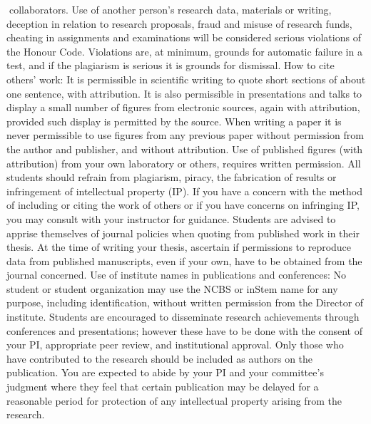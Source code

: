 \documentclass[a4paper,10pt]{article}
\begin{document}
collaborators. Use of another person’s research data, materials or writing, deception in
relation to research proposals, fraud and misuse of research funds, cheating in assignments
and examinations will be considered serious violations of the Honour Code. Violations are,
at minimum, grounds for automatic failure in a test, and if the plagiarism is serious it is
grounds for dismissal.
How to cite others’ work: It is permissible in scientific writing to quote short sections of
about one sentence, with attribution. It is also permissible in presentations and talks to
display a small number of figures from electronic sources, again with attribution, provided
such display is permitted by the source. When writing a paper it is never permissible to use
figures from any previous paper without permission from the author and publisher, and
without attribution. Use of published figures (with attribution) from your own laboratory or
others, requires written permission. All students should refrain from plagiarism, piracy, the
fabrication of results or infringement of intellectual property (IP). If you have a concern
with the method of including or citing the work of others or if you have concerns on
infringing IP, you may consult with your instructor for guidance. Students are advised to
apprise themselves of journal policies when quoting from published work in their thesis. At
the time of writing your thesis, ascertain if permissions to reproduce data from published
manuscripts, even if your own, have to be obtained from the journal concerned.
Use of institute names in publications and conferences: No student or student
organization may use the NCBS or inStem name for any purpose, including identification,
without written permission from the Director of institute. Students are encouraged to
disseminate research achievements through conferences and presentations; however these
have to be done with the consent of your PI, appropriate peer review, and institutional
approval. Only those who have contributed to the research should be included as authors on
the publication. You are expected to abide by your PI and your committee’s judgment where
they feel that certain publication may be delayed for a reasonable period for protection of
any intellectual property arising from the research.
\end{document}
